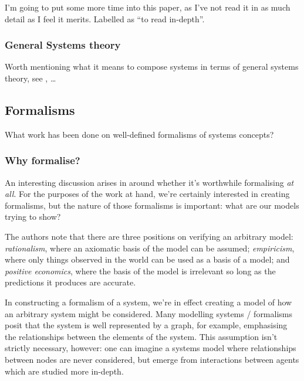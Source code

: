 \documentclass[12pt]{article}
\begin{document}
I'm going to put some more time into this paper, as I've not read it in as much
detail as I feel it merits. Labelled as ``to read in-depth''.


\subsubsection{General Systems theory}

Worth mentioning what it means to compose systems in terms of general systems
theory, see \cite{boulding1956general}, \cite{polanyi1968life}\ldots



\subsection{Formalisms}

What work has been done on well-defined formalisms of systems concepts?

\subsubsection{Why formalise?}

An interesting discussion arises in \cite{naylor1967verification} around whether
it's worthwhile formalising \emph{at all}. For the purposes of the work at hand,
we're certainly interested in creating formalisms, but the nature of those
formalisms is important: what are our models trying to show?\par

The authors note that there are three positions on verifying an arbitrary model:
\emph{rationalism}, where an axiomatic basis of the model can be assumed;
\emph{empiricism}, where only things observed in the world can be used as a
basis of a model; and \emph{positive economics}, where the basis of the model is
irrelevant so long as the predictions it produces are accurate.\par

In constructing a formalism of a system, we're in effect creating a model of how
an arbitrary system might be considered. Many modelling systems / formalisms
posit that the system is well represented by a graph, for example, emphasising
the relationships between the elements of the system. This assumption isn't
strictly necessary, however: one can imagine a systems model where relationships
between nodes are never considered, but emerge from interactions between agents
which are studied more in-depth.\par
\end{document}

